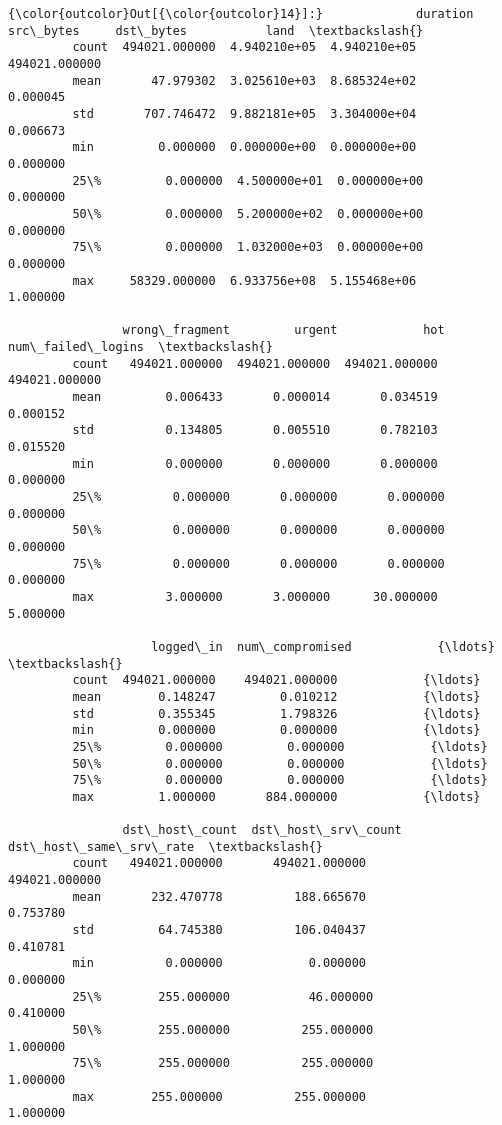 \documentclass[11pt]{article}
\begin{document}
\begin{Verbatim}[commandchars=\\\{\}]
{\color{outcolor}Out[{\color{outcolor}14}]:}             duration     src\_bytes     dst\_bytes           land  \textbackslash{}
         count  494021.000000  4.940210e+05  4.940210e+05  494021.000000   
         mean       47.979302  3.025610e+03  8.685324e+02       0.000045   
         std       707.746472  9.882181e+05  3.304000e+04       0.006673   
         min         0.000000  0.000000e+00  0.000000e+00       0.000000   
         25\%         0.000000  4.500000e+01  0.000000e+00       0.000000   
         50\%         0.000000  5.200000e+02  0.000000e+00       0.000000   
         75\%         0.000000  1.032000e+03  0.000000e+00       0.000000   
         max     58329.000000  6.933756e+08  5.155468e+06       1.000000   
         
                wrong\_fragment         urgent            hot  num\_failed\_logins  \textbackslash{}
         count   494021.000000  494021.000000  494021.000000      494021.000000   
         mean         0.006433       0.000014       0.034519           0.000152   
         std          0.134805       0.005510       0.782103           0.015520   
         min          0.000000       0.000000       0.000000           0.000000   
         25\%          0.000000       0.000000       0.000000           0.000000   
         50\%          0.000000       0.000000       0.000000           0.000000   
         75\%          0.000000       0.000000       0.000000           0.000000   
         max          3.000000       3.000000      30.000000           5.000000   
         
                    logged\_in  num\_compromised            {\ldots}             \textbackslash{}
         count  494021.000000    494021.000000            {\ldots}              
         mean        0.148247         0.010212            {\ldots}              
         std         0.355345         1.798326            {\ldots}              
         min         0.000000         0.000000            {\ldots}              
         25\%         0.000000         0.000000            {\ldots}              
         50\%         0.000000         0.000000            {\ldots}              
         75\%         0.000000         0.000000            {\ldots}              
         max         1.000000       884.000000            {\ldots}              
         
                dst\_host\_count  dst\_host\_srv\_count  dst\_host\_same\_srv\_rate  \textbackslash{}
         count   494021.000000       494021.000000           494021.000000   
         mean       232.470778          188.665670                0.753780   
         std         64.745380          106.040437                0.410781   
         min          0.000000            0.000000                0.000000   
         25\%        255.000000           46.000000                0.410000   
         50\%        255.000000          255.000000                1.000000   
         75\%        255.000000          255.000000                1.000000   
         max        255.000000          255.000000                1.000000   
         

\end{Verbatim}
\end{document}
